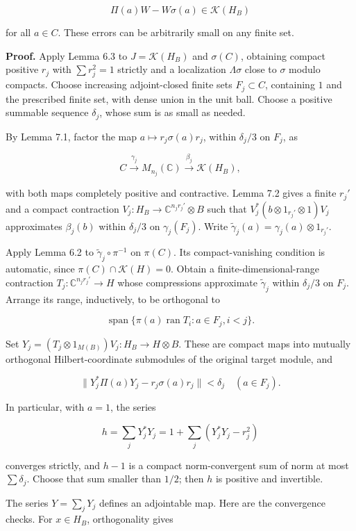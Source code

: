 \documentclass[
  11pt,
]{article}
\begin{document}
\[
\Pi(a)W-W\sigma(a)\in\mathcal K(H_B)
\]

for all \(a\in C\). These errors can be arbitrarily small on any finite
set.

\textbf{Proof.} Apply Lemma 6.3 to \(J=\mathcal K(H_B)\) and
\(\sigma(C)\), obtaining compact positive \(r_j\) with \(\sum r_j^2=1\)
strictly and a localization \(\Lambda\sigma\) close to \(\sigma\) modulo
compacts. Choose increasing adjoint-closed finite sets \(F_j\subset C\),
containing \(1\) and the prescribed finite set, with dense union in the
unit ball. Choose a positive summable sequence \(\delta_j\), whose sum
is as small as needed.

By Lemma 7.1, factor the map \(a\mapsto r_j\sigma(a)r_j\), within
\(\delta_j/3\) on \(F_j\), as

\[
C\overset{\gamma_j}{\longrightarrow}M_{n_j}(\mathbb C)
\overset{\beta_j}{\longrightarrow}\mathcal K(H_B),
\]

with both maps completely positive and contractive. Lemma 7.2 gives a
finite \(r_j'\) and a compact contraction
\(V_j:H_B\to\mathbb C^{n_jr_j'}\otimes B\) such that
\(V_j^*(b\otimes1_{r_j'}\otimes1)V_j\) approximates \(\beta_j(b)\)
within \(\delta_j/3\) on \(\gamma_j(F_j)\). Write
\(\widetilde\gamma_j(a)=\gamma_j(a)\otimes1_{r_j'}\).

Apply Lemma 6.2 to \(\widetilde\gamma_j\circ\pi^{-1}\) on \(\pi(C)\).
Its compact-vanishing condition is automatic, since
\(\pi(C)\cap\mathcal K(H)=0\). Obtain a finite-dimensional-range
contraction \(T_j:\mathbb C^{n_jr_j'}\to H\) whose compressions
approximate \(\widetilde\gamma_j\) within \(\delta_j/3\) on \(F_j\).
Arrange its range, inductively, to be orthogonal to

\[
\operatorname{span}\{\pi(a)\operatorname{ran}T_i:
a\in F_j, i<j\}.
\]

Set \(Y_j=(T_j\otimes1_{M(B)})V_j:H_B\to H\otimes B\). These are compact
maps into mutually orthogonal Hilbert-coordinate submodules of the
original target module, and

\[
\|Y_j^*\Pi(a)Y_j-r_j\sigma(a)r_j\|<\delta_j
\quad(a\in F_j).
\]

In particular, with \(a=1\), the series

\[
h=\sum_jY_j^*Y_j
=1+\sum_j(Y_j^*Y_j-r_j^2)
\]

converges strictly, and \(h-1\) is a compact norm-convergent sum of norm
at most \(\sum\delta_j\). Choose that sum smaller than \(1/2\); then
\(h\) is positive and invertible.

The series \(Y=\sum_jY_j\) defines an adjointable map. Here are the
convergence checks. For \(x\in H_B\), orthogonality gives
\end{document}
